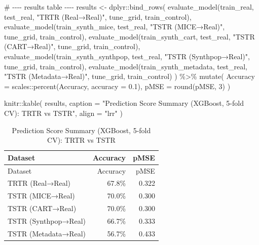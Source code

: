 \documentclass[
  letterpaper,
  DIV=11,
  numbers=noendperiod]{scrartcl}
\newenvironment{Shaded}{\begin{snugshade}}{\end{snugshade}}
\newcommand{\AttributeTok}[1]{\textcolor[rgb]{0.40,0.45,0.13}{#1}}
\newcommand{\CommentTok}[1]{\textcolor[rgb]{0.37,0.37,0.37}{#1}}
\newcommand{\DecValTok}[1]{\textcolor[rgb]{0.68,0.00,0.00}{#1}}
\newcommand{\FloatTok}[1]{\textcolor[rgb]{0.68,0.00,0.00}{#1}}
\newcommand{\FunctionTok}[1]{\textcolor[rgb]{0.28,0.35,0.67}{#1}}
\newcommand{\NormalTok}[1]{\textcolor[rgb]{0.00,0.23,0.31}{#1}}
\newcommand{\OtherTok}[1]{\textcolor[rgb]{0.00,0.23,0.31}{#1}}
\newcommand{\SpecialCharTok}[1]{\textcolor[rgb]{0.37,0.37,0.37}{#1}}
\newcommand{\StringTok}[1]{\textcolor[rgb]{0.13,0.47,0.30}{#1}}
\begin{document}
\begin{Shaded}
\begin{Highlighting}[]
\CommentTok{\# {-}{-}{-}{-} results table {-}{-}{-}{-}}
\NormalTok{results }\OtherTok{\textless{}{-}}\NormalTok{ dplyr}\SpecialCharTok{::}\FunctionTok{bind\_rows}\NormalTok{(}
  \FunctionTok{evaluate\_model}\NormalTok{(train\_real,               test\_real, }\StringTok{"TRTR (Real→Real)"}\NormalTok{,     tune\_grid, train\_control),}
  \FunctionTok{evaluate\_model}\NormalTok{(train\_synth\_mice,         test\_real, }\StringTok{"TSTR (MICE→Real)"}\NormalTok{,     tune\_grid, train\_control),}
  \FunctionTok{evaluate\_model}\NormalTok{(train\_synth\_cart,         test\_real, }\StringTok{"TSTR (CART→Real)"}\NormalTok{,     tune\_grid, train\_control),}
  \FunctionTok{evaluate\_model}\NormalTok{(train\_synth\_synthpop,     test\_real, }\StringTok{"TSTR (Synthpop→Real)"}\NormalTok{, tune\_grid, train\_control),}
  \FunctionTok{evaluate\_model}\NormalTok{(train\_synth\_metadata,     test\_real, }\StringTok{"TSTR (Metadata→Real)"}\NormalTok{, tune\_grid, train\_control)}
\NormalTok{) }\SpecialCharTok{\%\textgreater{}\%}
  \FunctionTok{mutate}\NormalTok{(}
    \AttributeTok{Accuracy =}\NormalTok{ scales}\SpecialCharTok{::}\FunctionTok{percent}\NormalTok{(Accuracy, }\AttributeTok{accuracy =} \FloatTok{0.1}\NormalTok{),}
    \AttributeTok{pMSE     =} \FunctionTok{round}\NormalTok{(pMSE, }\DecValTok{3}\NormalTok{)}
\NormalTok{  )}

\NormalTok{knitr}\SpecialCharTok{::}\FunctionTok{kable}\NormalTok{(}
\NormalTok{  results,}
  \AttributeTok{caption =} \StringTok{"Prediction Score Summary (XGBoost, 5{-}fold CV): TRTR vs TSTR"}\NormalTok{,}
  \AttributeTok{align =} \StringTok{"lrr"}
\NormalTok{)}
\end{Highlighting}
\end{Shaded}

\begin{longtable}[]{@{}lrr@{}}
\caption{Prediction Score Summary (XGBoost, 5-fold CV): TRTR vs
TSTR}\tabularnewline
\toprule\noalign{}
Dataset & Accuracy & pMSE \\
\midrule\noalign{}
\endfirsthead
\toprule\noalign{}
Dataset & Accuracy & pMSE \\
\midrule\noalign{}
\endhead
\bottomrule\noalign{}
\endlastfoot
TRTR (Real→Real) & 67.8\% & 0.322 \\
TSTR (MICE→Real) & 70.0\% & 0.300 \\
TSTR (CART→Real) & 70.0\% & 0.300 \\
TSTR (Synthpop→Real) & 66.7\% & 0.333 \\
TSTR (Metadata→Real) & 56.7\% & 0.433 \\
\end{longtable}
\end{document}
